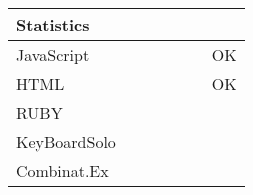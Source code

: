 \documentclass[a4paper,10pt]{article}
\begin{document}
\begin{table}
\begin{tabular}{|l|p{1.5cm}|p{1.5cm}|p{1.5cm}|p{1.5cm}|p{1.5cm}|p{1.5cm}|}
   \hline
   Statistics   &         &         &     &     &         &      \\
   \hline
   JavaScript   &         &         &     &     &         &  OK  \\
   \hline
   HTML         &         &         &     &     &         &  OK  \\
   \hline
   RUBY         &         &         &     &     &         &      \\
   \hline
   KeyBoardSolo &         &         &     &     &         &      \\
   \hline
   Combinat.Ex  &         &         &     &     &         &      \\
   \hline
   \hline
 \end{tabular}
 \label{table:30042021}
\end{table}
\end{document}
